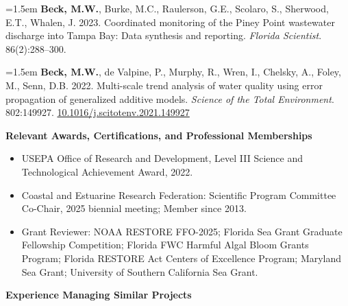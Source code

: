 \documentclass[letterpaper,12pt]{article}
\newcommand{\pub}[1]{%
  \begingroup
  \hangindent=1.5em
  #1\par
  \endgroup
  \vspace{3pt}%
}
\begin{document}
\pub{\textbf{Beck, M.W.}, Burke, M.C., Raulerson, G.E., Scolaro, S., Sherwood, E.T., Whalen, J. 2023. Coordinated monitoring of the Piney Point wastewater discharge into Tampa Bay: Data synthesis and reporting. \textit{Florida Scientist}. 86(2):288--300.}

\pub{\textbf{Beck, M.W.}, de Valpine, P., Murphy, R., Wren, I., Chelsky, A., Foley, M., Senn, D.B. 2022. Multi-scale trend analysis of water quality using error propagation of generalized additive models. \textit{Science of the Total Environment}. 802:149927. {\footnotesize\href{https://doi.org/10.1016/j.scitotenv.2021.149927}{10.1016/j.scitotenv.2021.149927}}}

\vspace{4pt}
\noindent\textbf{Relevant Awards, Certifications, and Professional Memberships}

\vspace{4pt}
\begin{itemize}
\item USEPA Office of Research and Development, Level III Science and Technological Achievement Award, 2022.
\item Coastal and Estuarine Research Federation: Scientific Program Committee Co-Chair, 2025 biennial meeting; Member since 2013.
\item Grant Reviewer: NOAA RESTORE FFO-2025; Florida Sea Grant Graduate Fellowship Competition; Florida FWC Harmful Algal Bloom Grants Program; Florida RESTORE Act Centers of Excellence Program; Maryland Sea Grant; University of Southern California Sea Grant.
\end{itemize}

\vspace{4pt}
\noindent\textbf{Experience Managing Similar Projects}
\end{document}
